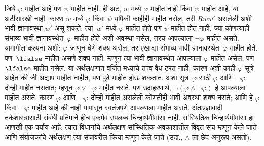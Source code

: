 जिथे $\varphi$ माहीत आहे पण $\psi$ माहीत नाही.
ही अट, $w$ मध्ये $\varphi$ माहीत नाही किंवा
$\psi$ माहीत आहे, या अटीसारखी नाही. कारण
$w$ मध्ये $\varphi$ किंवा $\psi$ यांपैकी काहीही माहीत
नसेल, तरी $Rww'$ असलेली अशी भावी ज्ञानावस्था
$w'$ असू शकते; त्या~$w'$ मध्ये $\varphi$ माहीत होते
पण $\psi$ माहीत होत नाही.
ज्या कोणत्याही संभाव्य भावी ज्ञानावस्थेत~$\varphi$
माहीत होते अशी अवस्था नसेल, तरच आपल्याला
$\lnot \varphi$ माहीत असते. यामागील कल्पना अशी:
$\varphi$ जाणून घेणे शक्य असेल, तर एखाद्या
संभाव्य भावी ज्ञानावस्थेत~$\varphi$ माहीत होते.
पण~$\lfalse$ माहीत असणे शक्य नाही; म्हणून
त्या भावी ज्ञानावस्थेत आपल्याला $\varphi$ माहीत
असेल, पण~$\lfalse$ माहीत नसेल.
या अर्थलक्षणात वर्जित मध्याचे तत्त्व वैध ठरत नाही.
कारण अशी काही $\varphi$ सूत्रे आहेत की जी अद्याप
माहीत नाहीत, पण पुढे माहीत होऊ शकतात.
अशा सूत्र~$\varphi$ साठी $\varphi$ आणि~$\lnot \varphi$
दोन्ही माहीत नसतात; म्हणून $\varphi \lor \lnot \varphi$
माहीत नसते. पण उदाहरणार्थ, $\lnot(\varphi
\land \lnot \varphi)$ हे आपल्याला माहीत असते.
कारण $\varphi$ आणि~$\lnot \varphi$ दोन्ही माहीत असलेली
कोणतीही भावी अवस्था शक्य नसते; आणि हे
$\varphi$ किंवा~$\lnot \varphi$ माहीत आहे की नाही
यापासून स्वतंत्रपणे आपल्याला माहीत असते.
अंतःप्रज्ञावादी तर्कशास्त्रासाठी संबंधी प्रतिमाने
हीच एकमेव उपलब्ध चिन्हार्थमीमांसा नाही.
सांस्थितिक चिन्हार्थमीमांसा हा आणखी एक पर्याय आहे:
त्यात विधानांचे अर्थलक्षण सांस्थितिक अवकाशातील
विवृत संच म्हणून केले जाते आणि संयोजकांचे
अर्थलक्षण त्या संचांवरील क्रिया म्हणून केले जाते
(उदा., $\land$ ला छेद अनुरूप असतो).
